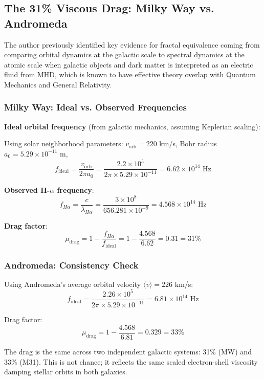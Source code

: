\documentclass[11pt,a4paper]{article}
\begin{document}
\subsection{The 31\% Viscous Drag: Milky Way vs. Andromeda}

The author previously identified key evidence for fractal equivalence coming from comparing orbital dynamics at the galactic scale to spectral dynamics at the atomic scale when galactic objects and dark matter is interpreted as an electric fluid from MHD, which is known to have effective theory overlap with Quantum Mechanics and General Relativity.    

\subsubsection{Milky Way: Ideal vs. Observed Frequencies}

\noindent\textbf{Ideal orbital frequency} (from galactic mechanics, assuming Keplerian scaling):

Using solar neighborhood parameters: $v_{\text{orb}} = 220$ km/s, Bohr radius $a_0 = 5.29 \times 10^{-11}$ m,
\[
f_{\text{ideal}} = \frac{v_{\text{orb}}}{2\pi a_0} = \frac{2.2 \times 10^5}{2\pi \times 5.29 \times 10^{-11}} = 6.62 \times 10^{14} \text{ Hz}
\]

\noindent\textbf{Observed H-$\alpha$ frequency}:
\[
f_{H\alpha} = \frac{c}{\lambda_{H\alpha}} = \frac{3 \times 10^8}{656.281 \times 10^{-9}} = 4.568 \times 10^{14} \text{ Hz}
\]

\noindent\textbf{Drag factor}:
\[
\mu_{\text{drag}} = 1 - \frac{f_{H\alpha}}{f_{\text{ideal}}} = 1 - \frac{4.568}{6.62} = 0.31 = \boxed{31\%}
\]

\subsubsection{Andromeda: Consistency Check}

Using Andromeda's average orbital velocity $\langle v \rangle = 226$ km/s:
\[
f_{\text{ideal}} = \frac{2.26 \times 10^5}{2\pi \times 5.29 \times 10^{-11}} = 6.81 \times 10^{14} \text{ Hz}
\]

\noindent Drag factor:
\[
\mu_{\text{drag}} = 1 - \frac{4.568}{6.81} = 0.329 = \boxed{33\%}
\]

The drag is the same across two independent galactic systems: 31\% (MW) and 33\% (M31). This is not chance; it reflects the same scaled electron-shell viscosity damping stellar orbits in both galaxies.
\end{document}
